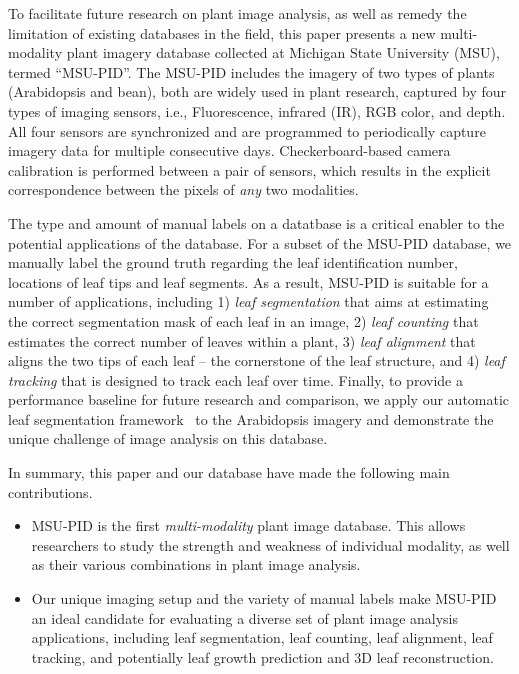 To facilitate future research on plant image analysis, as well as remedy the limitation of existing databases in the field, this paper presents a new multi-modality plant imagery database collected at Michigan State University (MSU), termed ``MSU-PID''. The MSU-PID includes the imagery of two types of plants (Arabidopsis and bean), both are widely used in plant research, captured by four types of imaging sensors, i.e., Fluorescence, infrared (IR), RGB color, and depth.
All four sensors are synchronized and are programmed to periodically capture imagery data for multiple consecutive days. 
Checkerboard-based camera calibration is performed between a pair of sensors, which results in the explicit correspondence between the pixels of {\it any} two modalities. 

The type and amount of manual labels on a datatbase is a critical enabler to the potential applications of the database.
For a subset of the MSU-PID database, we manually label the ground truth regarding the leaf identification number, locations of leaf tips and leaf segments. 
As a result,  MSU-PID is suitable for a number of applications, including 1) {\it leaf segmentation} that aims at estimating the correct segmentation mask of each leaf in an image, 2) {\it leaf counting} that estimates the correct number of leaves within a plant, 3) {\it leaf alignment} that aligns the two tips of each leaf -- the cornerstone of the leaf structure, and 4) {\it leaf tracking} that is designed to track each leaf over time.
Finally, to provide a performance baseline for future research and comparison, we apply our automatic leaf segmentation framework~\cite{yin2014a,yin2014b} to the Arabidopsis imagery and demonstrate the unique challenge of image analysis on this database.





In summary, this paper and our database have made the following main contributions.
\begin{itemize}
\item MSU-PID is the first {\it multi-modality} plant image database. This allows researchers to study the strength and weakness of individual modality, as well as their various combinations in plant image analysis.
\item Our unique imaging setup and the variety of manual labels make MSU-PID an ideal candidate for evaluating a diverse set of plant image analysis applications, including leaf segmentation, leaf counting, leaf alignment, leaf tracking, and potentially leaf growth prediction and $3$D leaf reconstruction.
\end{itemize}




